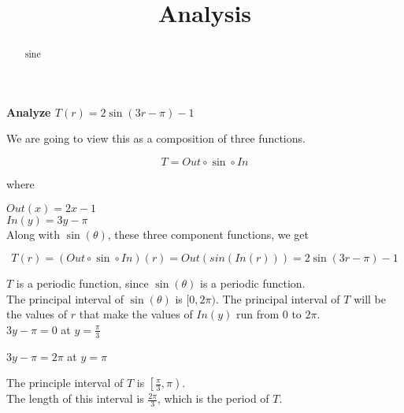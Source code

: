 \documentclass{ximera}
\title{Analysis}
\begin{document}
\begin{abstract}
sine
\end{abstract}
\maketitle












\textbf{\textcolor{purple!85!blue}{Analyze  $T(r) =  2 \sin(3r - \pi) - 1$}}



\begin{template}


We are going to view this as a composition of three functions.


\[
T = Out \circ \sin \circ In
\]


where


$Out(x) = 2x - 1$ \\


$In(y) = 3y - \pi$ \\




Along with $\sin(\theta)$, these three component functions, we get



\[
T(r) = (Out \circ \sin \circ In)(r) = Out(sin(In(r)))  = 2 \sin(3r - \pi) - 1
\]




\end{template}

$T$ is a periodic function, since $\sin(\theta)$ is a periodic function. \\

The principal interval of $\sin(\theta)$ is $[0, 2\pi)$.  The principal interval of $T$ will be the values of $r$ that make the values of $In(y)$ run from $0$ to $2\pi$. \\


$3y - \pi = 0$ at $y = \frac{\pi}{3}$

$3y - \pi = 2\pi$ at $y = \pi$

The principle interval of $T$ is $\left[ \frac{\pi}{3}, \pi \right)$. \\

The length of this interval is $\frac{2\pi}{3}$, which is the period of $T$. \\
\end{document}
